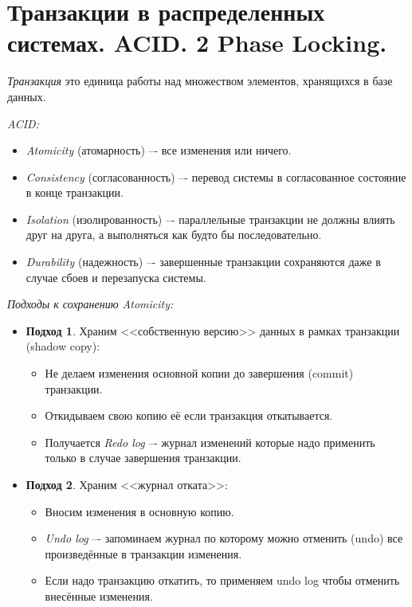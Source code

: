 \section{Транзакции в распределенных системах. ACID. 2 Phase Locking.}

\begin{definition}
    \textit{Транзакция} это единица работы над множеством элементов,
    хранящихся в базе данных.
\end{definition}

\begin{definition} \textit{ACID:}
    \begin{itemize}
        \item \textit{Atomicity} (атомарность) –- все изменения или ничего.
        \item \textit{Consistency} (согласованность) –- перевод системы в согласованное
            состояние в конце транзакции.
        \item \textit{Isolation} (изолированность) –- параллельные транзакции не
            должны влиять друг на друга, а выполняться как будто бы
            последовательно.
        \item \textit{Durability} (надежность) –- завершенные транзакции сохраняются
            даже в случае сбоев и перезапуска системы.
    \end{itemize}
\end{definition}

\begin{algorithm} \textit{Подходы к сохранению Atomicity:}
    \begin{itemize}
        \item \textbf{Подход 1}. Храним <<собственную версию>> данных в рамках транзакции (shadow copy):
            \begin{itemize}
                \item Не делаем изменения основной копии до завершения (commit) транзакции.
                \item Откидываем свою копию её если транзакция откатывается.
                \item Получается \textit{Redo log} –- журнал изменений которые надо
                    применить только в случае завершения транзакции.
            \end{itemize}
        \item \textbf{Подход 2}. Храним <<журнал отката>>:
            \begin{itemize}
                \item Вносим изменения в основную копию.
                \item \textit{Undo log} –- запоминаем журнал по которому можно отменить
                    (undo) все произведённые в транзакции изменения.
                \item Если надо транзакцию откатить, то применяем undo log чтобы
                    отменить внесённые изменения.
            \end{itemize}
    \end{itemize}
\end{algorithm}

